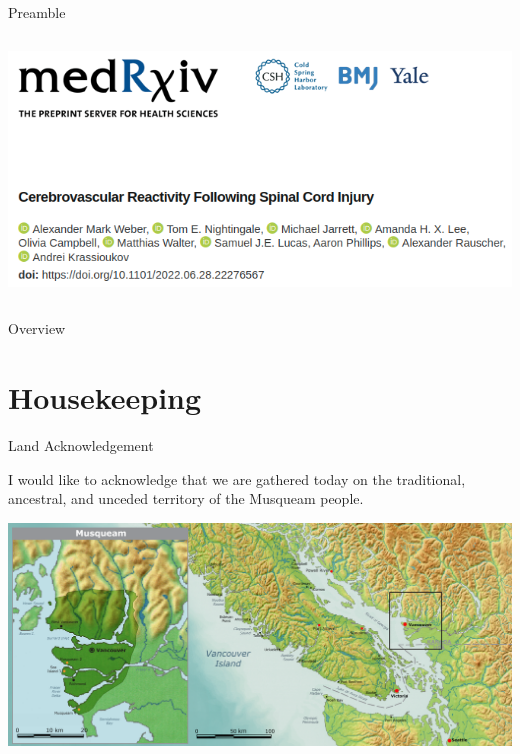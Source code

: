 \documentclass[aspectratio=169,xcolor=dvipsnames]{beamer}
\begin{document}
\begin{frame}{Preamble}
\begin{columns}[c]
\vspace{1cm}

\includegraphics[width=1\textwidth]{imgs/lit4}

\end{columns}
\end{frame}

\begin{frame}{Overview}
    \tableofcontents
\end{frame}

\section{Housekeeping}

\begin{frame}{Land Acknowledgement}

I would like to acknowledge that we are gathered today on the traditional, ancestral, and unceded territory of the Musqueam people.

\vspace{0.2cm}
\begin{center}
\includegraphics[width=.9\textwidth]{imgs/musqueam}
\end{center}

\end{frame}
\end{document}
